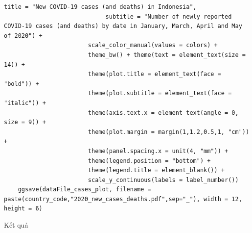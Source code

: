 \documentclass[a4paper]{article}
\theoremstyle{definition}
\begin{document}
\begin{enumerate}[1)]
\begin{lstlisting}[gobble=4]
                             title = "New COVID-19 cases (and deaths) in Indonesia",
                             subtitle = "Number of newly reported COVID-19 cases (and deaths) by date in January, March, April and May of 2020") +
                        scale_color_manual(values = colors) +
                        theme_bw() + theme(text = element_text(size = 14)) +
                        theme(plot.title = element_text(face = "bold")) +
                        theme(plot.subtitle = element_text(face = "italic")) +
                        theme(axis.text.x = element_text(angle = 0, size = 9)) +
                        theme(plot.margin = margin(1,1.2,0.5,1, "cm")) +
                        theme(panel.spacing.x = unit(4, "mm")) +
                        theme(legend.position = "bottom") +
                        theme(legend.title = element_blank()) +
                        scale_y_continuous(labels = label_number())
    ggsave(dataFile_cases_plot, filename = paste(country_code,"2020_new_cases_deaths.pdf",sep="_"), width = 12, height = 6)
    \end{lstlisting}
    
    Kết quả
    

\end{enumerate}
\end{document}
